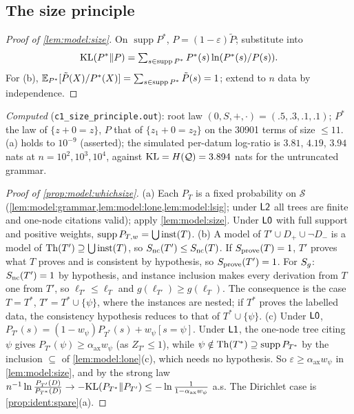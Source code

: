\subsection{The size principle}\label{app:model:size}

\begin{proof}[Proof of \cref{lem:model:size}]
On $\operatorname{supp}P^*$, $P=(1-\varepsilon)\tilde P$; substitute into
\[\mathrm{KL}(P^*\|P)=\textstyle\sum_{s\in\operatorname{supp}P^*}P^*(s)\ln(P^*(s)/P(s)).\] For (b), $\mathbb{E}_{P^*}[\tilde P(X)/P^*(X)]=\sum_{s\in\operatorname{supp}P^*}\tilde P(s)=1$; extend to $n$ data by independence.
\end{proof}

\emph{Computed} (\texttt{c1\_size\_principle.out}): root law $(0,S,+,\cdot)=(.5,.3,.1,.1)$; $P^*$ the law of $\{z+0=z\}$, $P$ that of $\{z_1+0=z_2\}$ on the 30901 terms of size $\le11$. (a) holds to $10^{-9}$ (asserted); the simulated per-datum log-ratio is $3.81$, $4.19$, $3.94$ nats at $n=10^2,10^3,10^4$, against $\mathrm{KL}=H(\mathcal{Q})=3.894$ nats for the untruncated grammar.

\begin{proof}[Proof of \cref{prop:model:whichsize}]
(a) Each $P_T$ is a fixed probability on $\mathcal S$ (\cref{lem:model:grammar,lem:model:lone,lem:model:lsig}; under $\mathord{\mathsf{L2}}$ all trees are finite and one-node citations valid); apply \cref{lem:model:size}. Under $\mathord{\mathsf{L0}}$ with full support and positive weights, $\operatorname{supp}P_{T,w}=\bigcup\mathrm{inst}(T)$.
(b) A model of $T'\cup D_+\cup\neg D_-$ is a model of $\mathrm{Th}(T')\supseteq\bigcup\mathrm{inst}(T)$, so $S_{\mathrm{nc}}(T')\le S_{\mathrm{nc}}(T)$. If $S_{\mathrm{prove}}(T)=1$, $T'$ proves what $T$ proves and is consistent by hypothesis, so $S_{\mathrm{prove}}(T')=1$. For $S_{g}$: $S_{\mathrm{nc}}(T')=1$ by hypothesis, and instance inclusion makes every derivation from $T$ one from $T'$, so $\ell_{T'}\le\ell_T$ and $g(\ell_{T'})\ge g(\ell_T)$. The consequence is the case $T=T^*$, $T'=T^*\cup\{\psi\}$, where the instances are nested; if $T^*$ proves the labelled data, the consistency hypothesis reduces to that of $T^*\cup\{\psi\}$.
(c) Under $\mathord{\mathsf{L0}}$, $P_{T'}(s)=(1-w_\psi)P_{T^*}(s)+w_\psi[s=\psi]$. Under $\mathord{\mathsf{L1}}$, the one-node tree citing $\psi$ gives $P_{T'}(\psi)\ge\alpha_{\mathrm{ax}}w_\psi$ (as $Z_{T'}\le1$), while $\psi\notin\mathrm{Th}(T^*)\supseteq\operatorname{supp}P_{T^*}$ by the inclusion $\subseteq$ of \cref{lem:model:lone}(c), which needs no hypothesis. So $\varepsilon\ge\alpha_{\mathrm{ax}}w_\psi$ in \cref{lem:model:size}, and by the strong law $n^{-1}\ln\frac{P_{T'}(D)}{P_{T^*}(D)}\to-\mathrm{KL}(P_{T^*}\|P_{T'})\le-\ln\frac1{1-\alpha_{\mathrm{ax}}w_\psi}$ a.s. The Dirichlet case is \cref{prop:ident:spare}(a).
\end{proof}

